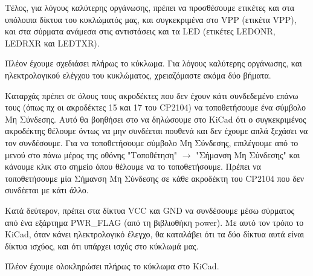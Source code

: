\documentclass[a4paper]{article}
\begin{document}
\begin{figure}
  \begin{center}
    \label{fig:kicad-main}
  \end{center}
\end{figure}

Τέλος, για λόγους καλύτερης οργάνωσης, πρέπει να προσθέσουμε ετικέτες και στα υπόλοιπα δίκτυα του κυκλώματός μας, και συγκεκριμένα στο VPP (ετικέτα VPP), και στα σύρματα ανάμεσα στις αντιστάσεις και τα \textenglish{LED} (ετικέτες \textenglish{LED}ONR, \textenglish{LED}RXR και \textenglish{LED}TXR).

Πλέον έχουμε σχεδιάσει πλήρως το κύκλωμα. Για λόγους καλύτερης οργάνωσης, και ηλεκτρολογικού ελέγχου του κυκλώματος, χρειαζόμαστε ακόμα δύο βήματα.

Καταρχάς πρέπει σε όλους τους ακροδέκτες που δεν έχουν κάτι συνδεδεμένο επάνω τους (όπως πχ οι ακροδέκτες 15 και 17 του \textenglish{CP2104}) να τοποθετήσουμε ένα σύμβολο Μη Σύνδεσης. Αυτό θα βοηθήσει στο να δηλώσουμε στο \textenglish{KiCad} ότι ο συγκεκριμένος ακροδέκτης θέλουμε όντως να μην συνδέεται πουθενά και δεν έχουμε απλά ξεχάσει να τον συνδέσουμε. Για να τοποθετήσουμε σύμβολο Μη Σύνδεσης, επιλέγουμε από το μενού στο πάνω μέρος της οθόνης "Τοποθέτηση" $\rightarrow$ "Σήμανση Μη Σύνδεσης" και κάνουμε κλικ στο σημείο όπου θέλουμε να το τοποθετήσουμε. Πρέπει να τοποθετήσουμε μία Σήμανση Μη Σύνδεσης σε κάθε ακροδέκτη του \textenglish{CP2104} που δεν συνδέεται με κάτι άλλο.

Κατά δεύτερον, πρέπει στα δίκτυα VCC και GND να συνδέσουμε μέσω σύρματος από ένα εξάρτημα PWR\_FLAG (από τη βιβλιοθήκη power). Με αυτό τον τρόπο το \textenglish{KiCad}, όταν κάνει ηλεκτρολογικό έλεγχο, θα καταλάβει ότι τα δύο δίκτυα αυτά είναι δίκτυα ισχύος, και ότι υπάρχει ισχύς στο κύκλωμά μας.

Πλέον έχουμε ολοκληρώσει πλήρως το κύκλωμα στο \textenglish{KiCad}.
\end{document}
